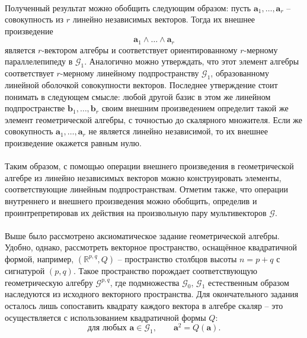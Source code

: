 \documentclass[12pt]{article}
\begin{document}
\paragraph{}
Полученный результат можно обобщить следующим образом: пусть $\mathbf{a}_1, \dots, \mathbf{a}_r$ -- совокупность из $r$ линейно независимых векторов. Тогда их внешнее произведение 
$$ \mathbf{a}_1 \wedge \dots \wedge \mathbf{a}_r$$
является $r$-вектором алгебры и соответствует ориентированному $r$-мерному параллелепипеду в $\mathcal{G}_1$. Аналогично можно утверждать, что этот элемент алгебры соответствует $r$-мерному линейному подпространству $\mathcal{G}_1$, образованному линейной оболочкой совокупности векторов. Последнее утверждение стоит понимать в следующем смысле: любой другой базис в этом же линейном подпространстве $\mathbf{b}_1, \dots, \mathbf{b}_r$ своим внешним произведением определит такой же элемент геометрической алгебры, с точностью до скалярного множителя.
Если же совокупность $\mathbf{a}_1, \dots, \mathbf{a}_r$ не является линейно независимой, то их внешнее произведение окажется равным нулю. 
\paragraph{}
Таким образом, с помощью операции внешнего произведения в геометрической алгебре из линейно независимых векторов можно конструировать элементы, соответствующие линейным подпространствам. Отметим также, что операции внутреннего и внешнего произведения можно обобщить, определив и проинтрепретировав их действия на произвольную пару мультивекторов $\mathcal{G}$.
\paragraph{}
Выше было рассмотрено аксиоматическое задание геометрической алгебры. Удобно, однако, рассмотреть векторное пространство, оснащённое квадратичной формой, например, $(\mathds{R}^{p,q}, Q)$ -- пространство столбцов высоты $n = p+q$ с сигнатурой $(p,q)$. Такое пространство порождает соответствующую геометрическую алгебру $\mathcal{G}^{p,q}$, где подмножества $\mathcal{G}_0$, $\mathcal{G}_1$ естественным образом наследуются из исходного векторного пространства. Для окончательного задания осталось лишь сопоставить квадрату каждого вектора в алгебре скаляр -- это осуществляется с использованием квадратичной формы $Q$: 
$$ \text{для любых } \mathbf{a} \in \mathcal{G}_1, \quad \quad \mathbf{a}^2 = Q(\mathbf{a}).$$
\end{document}
